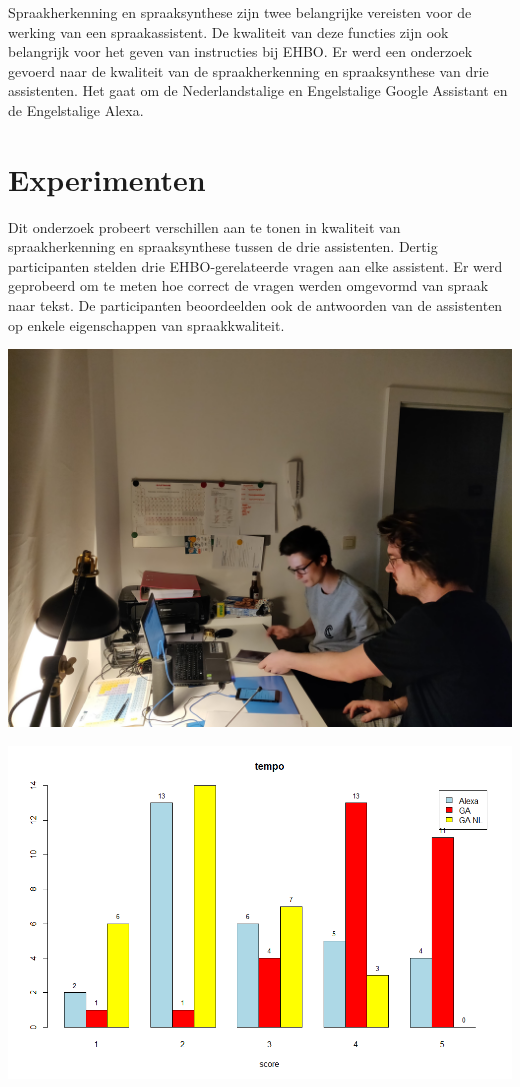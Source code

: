\documentclass[a0,portrait]{a0poster}
\begin{document}
\begin{multicols}{2}
Spraakherkenning en spraaksynthese zijn twee belangrijke vereisten voor de werking van een spraakassistent. De kwaliteit van deze functies zijn ook belangrijk voor het geven van instructies bij EHBO. Er werd een onderzoek gevoerd naar de kwaliteit van de spraakherkenning en spraaksynthese van drie assistenten. Het gaat om de Nederlandstalige en Engelstalige Google Assistant en de Engelstalige Alexa.

\color{Black} %
\color{HoGentAccent1} 
\section*{Experimenten}
\color{black}

Dit onderzoek probeert verschillen aan te tonen in kwaliteit van spraakherkenning en spraaksynthese tussen de drie assistenten. Dertig participanten stelden drie EHBO-gerelateerde vragen aan elke assistent. Er werd geprobeerd om te meten hoe correct de vragen werden omgevormd van spraak naar tekst. De participanten beoordeelden ook de antwoorden van de assistenten op enkele eigenschappen van spraakkwaliteit.

\begin{center}\vspace{1cm}
    \includegraphics[width=0.44\linewidth]{../bachproef/img/proefafname2}
\end{center}\vspace{1cm}

\begin{center}\vspace{1cm}
    \includegraphics[width=0.44\linewidth]{../onderzoek/onderzoeksresultaten/vergelijking_assistenten_per_eigenschap/barplot/barplot_score_tempo}
\end{center}\vspace{1cm}


\end{multicols}
\end{document}
